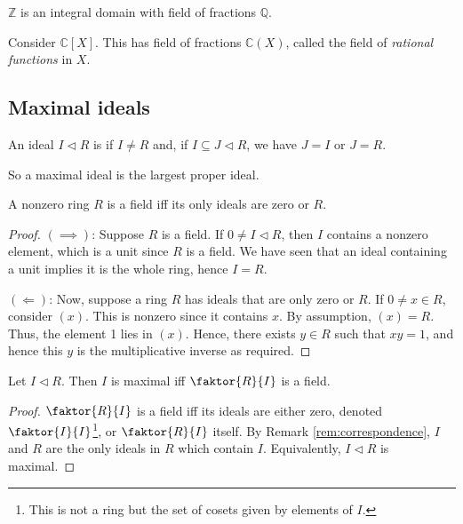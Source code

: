 \begin{example}
	$\mathbb{Z}$ is an integral domain with field of fractions $\mathbb{Q}$.
\end{example} 

\begin{example}
	Consider $\mathbb C[X]$.
	This has field of fractions $\mathbb C(X)$, called the field of \textit{rational functions} in $X$.
\end{example}

\subsection{Maximal ideals}
\begin{definition}
	An ideal $I \triangleleft R$ is  if $I \neq R$ and, if $I \subseteq J \triangleleft R$, we have $J = I$ or $J = R$.
\end{definition}

So a maximal ideal is the largest proper ideal.

\begin{lemma} \label{lem:9.6}
	A nonzero ring $R$ is a field iff its only ideals are zero or $R$.
\end{lemma}

\begin{proof}
	$(\implies)$: Suppose $R$ is a field.
	If $0 \neq I \triangleleft R$, then $I$ contains a nonzero element, which is a unit since $R$ is a field.
	We have seen that an ideal containing a unit implies it is the whole ring, hence $I = R$.

	$(\Longleftarrow)$: Now, suppose a ring $R$ has ideals that are only zero or $R$.
	If $0 \neq x \in R$, consider $(x)$.
	This is nonzero since it contains $x$.
	By assumption, $(x) = R$.
	Thus, the element 1 lies in $(x)$.
	Hence, there exists $y \in R$ such that $xy = 1$, and hence this $y$ is the multiplicative inverse as required.
\end{proof}

\begin{proposition} \label{prp:9.7}
	Let $I \triangleleft R$.
	Then $I$ is maximal iff $\faktor{R}{I}$ is a field.
\end{proposition}

\begin{proof}
	$\faktor{R}{I}$ is a field iff its ideals are either zero, denoted $\faktor{I}{I}$\footnote{This is not a ring but the set of cosets given by elements of $I$.}, or $\faktor{R}{I}$ itself.
	By Remark \ref{rem:correspondence}, $I$ and $R$ are the only ideals in $R$ which contain $I$.
	Equivalently, $I \triangleleft R$ is maximal.
\end{proof}


